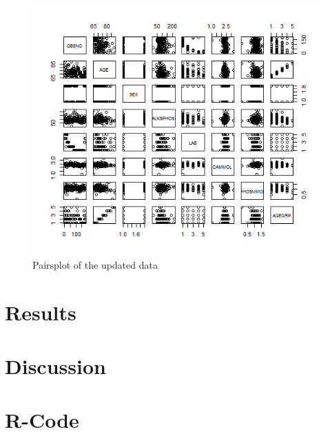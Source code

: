\documentclass{article}
\begin{document}
      \begin{figure}[H]
          \centering
          \includegraphics[scale=0.3]{../results/SecondPairs.png}
          \caption{Pairsplot of the updated data}
          \label{fig:SecondPairs}
      \end{figure}

  \section{Results}

  \section{Discussion}
    
  \section{R-Code}
    \begin{lstlisting}[language=R]
    \end{lstlisting}
\end{document}
